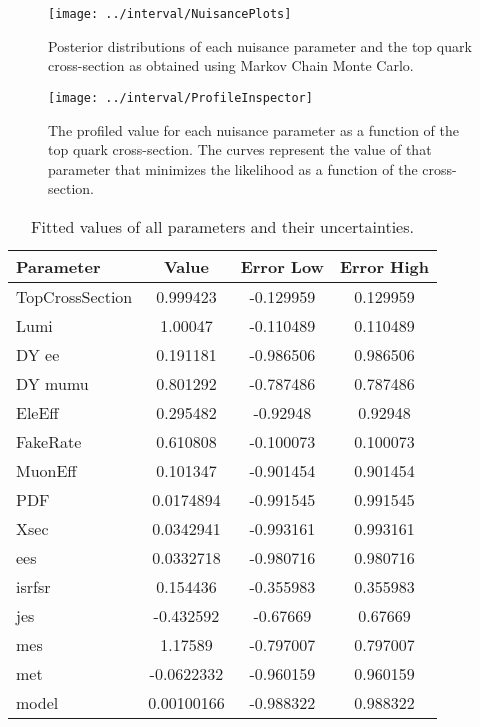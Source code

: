 \documentclass[11pt]{article}
\begin{document}
\begin{figure}[htbp]
  \begin{center}
    \texttt{[image: ../interval/NuisancePlots]}
    \caption{Posterior distributions of each nuisance parameter and the top quark cross-section as obtained using Markov Chain Monte Carlo.}
    \end{center}
  \begin{center}
    \texttt{[image: ../interval/ProfileInspector]}
    \caption{The profiled value for each nuisance parameter as a function of the top quark cross-section.  The curves represent the value of that parameter that minimizes the likelihood as a function of the cross-section.}
  \end{center}
\end{figure}
\clearpage
\newpage


\begin{table}[htbp]
  \begin{center}
    \begin{tabular}{|l|c|c|c|} \hline
      \hline
      Parameter     &     Value  &    Error Low  &    Error High \\
      \hline
      \hline
      TopCrossSection   &    0.999423   &   -0.129959  &     0.129959 \\
      \hline
      Lumi   &     1.00047   &   -0.110489  &     0.110489 \\
      DY ee   &    0.191181   &   -0.986506  &     0.986506 \\
      DY mumu   &    0.801292   &   -0.787486  &     0.787486 \\
      EleEff   &    0.295482   &    -0.92948  &      0.92948 \\
      FakeRate   &    0.610808   &   -0.100073  &     0.100073 \\
      MuonEff   &    0.101347   &   -0.901454  &     0.901454 \\
      PDF   &   0.0174894   &   -0.991545  &     0.991545 \\
      Xsec   &   0.0342941   &   -0.993161  &     0.993161 \\
      ees   &   0.0332718   &   -0.980716  &     0.980716 \\
      isrfsr   &    0.154436   &   -0.355983  &     0.355983 \\
      jes   &   -0.432592   &    -0.67669  &      0.67669 \\
      mes   &     1.17589   &   -0.797007  &     0.797007 \\
      met   &  -0.0622332   &   -0.960159  &     0.960159 \\
      model   &  0.00100166   &   -0.988322  &     0.988322 \\
      \hline
    \end{tabular}
  \end{center}
  \caption{\label{tab:importantSystematics}
    Fitted values of all parameters and their uncertainties. }
\end{table}
\end{document}
